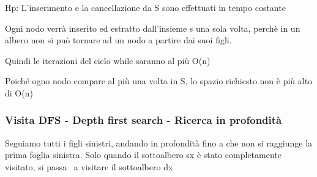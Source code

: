 \documentclass{article}
\begin{document}
{Hp: L'inserimento e la cancellazione da S sono effettuati in tempo
costante}

{}

{Ogni nodo verrà inserito ed estratto dall'insieme s una sola volta,
perchè in un albero non si può tornare ad un nodo a partire dai suoi
figli.}

{}

{Quindi le iterazioni del ciclo while saranno al più O(n)}

{Poiché ogno nodo compare al più una volta in S, lo spazio richiesto non
è più alto di O(n)}

{}

\hypertarget{h.5u7m241wpdag}{\subsubsection{\texorpdfstring{{Visita DFS
- Depth first search - Ricerca in
profondità}}{Visita DFS - Depth first search - Ricerca in profondità}}\label{h.5u7m241wpdag}}

{}

{Seguiamo tutti i figli sinistri, andando in profondità fino a che non
si raggiunge la prima foglia sinistra. Solo quando il sottoalbero sx è
stato completamente visitato, si passa ~a visitare il sottoalbero dx}

{}

\protect\hypertarget{t.e3f356e73d933eb65b1a6a8cfd4ee1a50561f73c}{}{}\protect\hypertarget{t.14}{}{}
\end{document}
